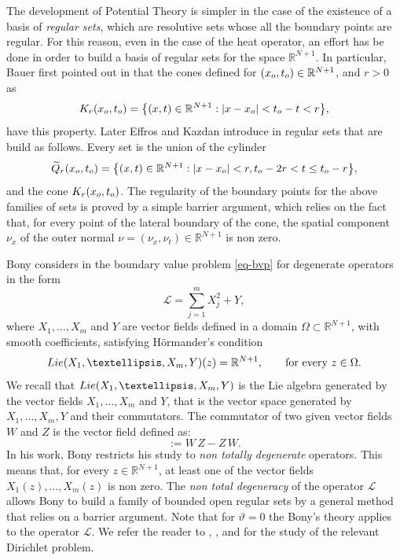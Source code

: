 \documentclass{amsart}
\numberwithin{equation}{section}
\def \R {{\mathbb {R}}}
\def \Lc{{\mathcal{L}}}
\begin{document}
{The development of  Potential Theory is simpler in the case of the existence of a basis of {\it regular sets}, which are resolutive sets whose all the boundary points are regular. For this reason, even in the case of the heat operator, an effort has be done in order to build a basis of regular sets for the space $\R^{N+1}$. 
In particular, Bauer first pointed out in \cite{Bau66} that the cones defined for $(x_{\rm o},t_{\rm o}) \in \R^{N+1}$, and $r>0$ as
\begin{equation*}
 K_r(x_{\rm o},t_{\rm o}) = \big\{ (x,t) \in \R^{N+1} : |x-x_{\rm o}| < t_{\rm o}-t < r \big\}, 
\end{equation*}
have this property. Later Effros and Kazdan introduce in \cite{EK70} regular sets that are build as follows. Every set is the union of the cylinder 
 \begin{equation*}
 \widetilde Q_r(x_{\rm o},t_{\rm o}) = \big\{ (x,t) \in \R^{N+1} : |x-x_{\rm o}| < r, t_{\rm o}- 2 r < t \le t_{\rm o} - r \big\}, 
\end{equation*}
and the cone $K_r(x_{\rm o},t_{\rm o})$.
The regularity of the boundary points for the above families of sets is  proved by a simple barrier argument, which relies on the fact that, for every point of the lateral boundary of the cone, the spatial component $\nu_x$ of the outer normal $\nu = \left(\nu_x, \nu_t\right) \in \R^{N+1}$ is non zero.

Bony considers in \cite{Bon69} the boundary value problem \eqref{eq-bvp} for degenerate operators in the form 
\begin{equation}\label{e1}
     \Lc = \sum_{j=1}^m X_j^2  + Y,
\end{equation}
where $X_1, \dots, X_m$ and $Y$ are vector fields defined in {a domain $\Omega \subset \mathbb{R}^{N+1}$}, with smooth coefficients, satisfying H\"ormander's condition \cite{Horm67}
\begin{equation}\label{e-Hormander}
  {\rm Lie} (X_1, \ldots, X_m, Y)(z) = \R^{N+1}, \qquad \text{for every} \ z \in \Omega.
\end{equation}
We recall that ${\rm Lie} (X_1, \ldots, X_m, Y)$ is the Lie algebra generated by the vector fields $X_1, \ldots, X_m$ and $ Y$, that is the vector space generated by  $X_1, \ldots, X_m, Y$ and their commutators. The commutator of two given vector fields $W$ and $Z$ is the vector field defined as:
\begin{equation*}
	[W,Z] := W \, Z -  Z \, W.
\end{equation*}
In his work, Bony restricts his study to \textit{non totally degenerate} operators. This means that, for every $z \in \R^{N+1}$, at least one of the vector fields  $X_1(z), \ldots, X_m(z)$ is non zero. The \textit{non total degeneracy} of the operator $\Lc$ allows Bony to build a family of bounded open regular sets by a general method that relies on a barrier argument. Note that for $\vartheta =0$ the Bony's theory applies to the operator $\Lc$. We refer the reader to \cite{CL09}, \cite{Kog17}, \cite{LP94} and \cite{Man97} for the study of the relevant Dirichlet problem. 

}
\end{document}
